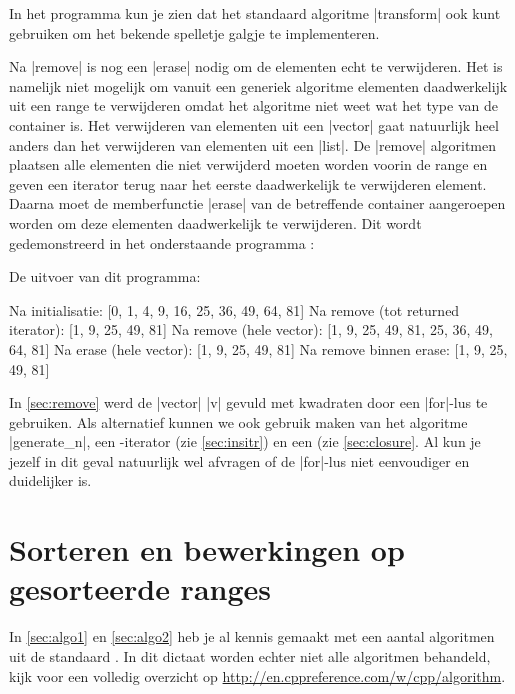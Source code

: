 \begin{cpplstShortInline}
In het programma  kun je zien dat het standaard algoritme |transform| ook kunt gebruiken om het bekende spelletje galgje te implementeren.

\label{sec:remove}
Na |remove| is nog een |erase| nodig om de elementen echt te verwijderen.
Het is namelijk niet mogelijk om vanuit een generiek algoritme elementen daadwerkelijk uit een range te verwijderen omdat het algoritme niet weet wat het type van de container is.
Het verwijderen van elementen uit een |vector| gaat natuurlijk heel anders dan het verwijderen van elementen uit een |list|.
De |remove| algoritmen plaatsen alle elementen die niet verwijderd moeten worden voorin de range en geven een iterator terug naar het eerste daadwerkelijk te verwijderen element.
Daarna moet de memberfunctie |erase| van de betreffende container aangeroepen worden om deze elementen daadwerkelijk te verwijderen.
Dit wordt gedemonstreerd in het onderstaande programma :


De uitvoer van dit programma:
\begin{coutput}
Na initialisatie: [0, 1, 4, 9, 16, 25, 36, 49, 64, 81]
Na remove (tot returned iterator): [1, 9, 25, 49, 81]
Na remove (hele vector): [1, 9, 25, 49, 81, 25, 36, 49, 64, 81]
Na erase (hele vector): [1, 9, 25, 49, 81]
Na remove binnen erase: [1, 9, 25, 49, 81]
\end{coutput}

\label{sec:generate}
In \cref{sec:remove} werd de |vector| |v| gevuld met kwadraten door een |for|\hyp{}lus te gebruiken.
Als alternatief kunnen we ook gebruik maken van het algoritme |generate_n|, een \hyp{}iterator (zie \cref{sec:insitr}) en een  (zie \cref{sec:closure}.
Al kun je jezelf in dit geval natuurlijk wel afvragen of de |for|\hyp{}lus niet eenvoudiger en duidelijker is.


\section{Sorteren en bewerkingen op gesorteerde ranges}
\label{sec:algo3}
In \cref{sec:algo1} en \cref{sec:algo2} heb je al kennis gemaakt met een aantal algoritmen uit de standaard \Cpp{} .
In dit dictaat worden echter niet alle algoritmen behandeld, kijk voor een volledig overzicht op \url{http://en.cppreference.com/w/cpp/algorithm}.


\end{cpplstShortInline}

